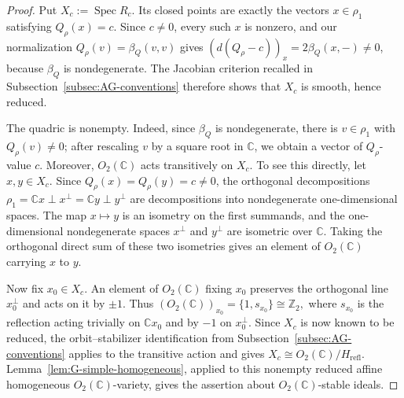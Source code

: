 \documentclass[10pt,a4paper]{amsart}
\numberwithin{equation}{section} \newtheorem{thm}{Theorem}[section] \newtheorem{lem}[thm]{Lemma} \newtheorem{ex}[thm]{Example} \newtheorem{prop}[thm]{Proposition} \newtheorem{cor}[thm]{Corollary} \newtheorem{defi}[thm]{Definition} \newtheorem{rmk}[thm]{Remark} \newtheorem{notation}[thm]{Notation}
\newcommand{\Spec}{\operatorname{Spec}}
\newcommand{\Otwo}{O_2(\C)}
\def\Z{\mathbb{Z}} \def\N{\mathbb{N}} \def\A{\mathbb{A}} \def\C{\mathbb{C}} \def\R{\mathbb{R}} \def\Q{\mathbb{Q}} \def\F{\mathbb{F}}
\begin{document}
\begin{proof}
Put $X_c:=\Spec R_c$. Its closed points are exactly the vectors $x\in\rho_1$ satisfying $Q_\rho(x)=c$. Since $c\ne0$, every such $x$ is nonzero, and our normalization $Q_\rho(v)=\beta_Q(v,v)$ gives \((d(Q_\rho-c))_x=2\beta_Q(x,-)\ne0\), because $\beta_Q$ is nondegenerate. The Jacobian criterion recalled in Subsection~\ref{subsec:AG-conventions} therefore shows that $X_c$ is smooth, hence reduced.

The quadric is nonempty. Indeed, since $\beta_Q$ is nondegenerate, there is $v\in\rho_1$ with $Q_\rho(v)\ne0$; after rescaling $v$ by a square root in $\C$, we obtain a vector of $Q_\rho$-value $c$. Moreover, $\Otwo$ acts transitively on $X_c$. To see this directly, let $x,y\in X_c$. Since $Q_\rho(x)=Q_\rho(y)=c\ne0$, the orthogonal decompositions \(\rho_1=\C x\perp x^\perp=\C y\perp y^\perp\) are decompositions into nondegenerate one-dimensional spaces. The map $x\mapsto y$ is an isometry on the first summands, and the one-dimensional nondegenerate spaces $x^\perp$ and $y^\perp$ are isometric over $\C$. Taking the orthogonal direct sum of these two isometries gives an element of $\Otwo$ carrying $x$ to $y$.

Now fix $x_0\in X_c$. An element of $\Otwo$ fixing $x_0$ preserves the orthogonal line $x_0^\perp$ and acts on it by $\pm1$. Thus \((\Otwo)_{x_0}=\{1,s_{x_0}\}\cong\Z_2,\) where $s_{x_0}$ is the reflection acting trivially on $\C x_0$ and by $-1$ on $x_0^\perp$. Since $X_c$ is now known to be reduced, the orbit--stabilizer identification from Subsection~\ref{subsec:AG-conventions} applies to the transitive action and gives \(X_c\cong\Otwo/H_{\mathrm{refl}}.\) Lemma~\ref{lem:G-simple-homogeneous}, applied to this nonempty reduced affine homogeneous $\Otwo$-variety, gives the assertion about $\Otwo$-stable ideals.


\end{proof}
\end{document}
